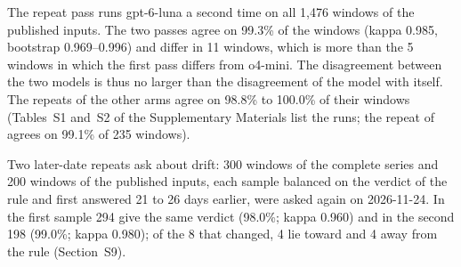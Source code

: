The repeat pass runs gpt-6-luna a second time on all 1{,}476 windows of the published inputs. The two passes agree on 99.3\% of the windows (kappa 0.985, bootstrap 0.969--0.996) and differ in 11 windows, which is more than the 5 windows in which the first pass differs from o4-mini. The disagreement between the two models is thus no larger than the disagreement of the model with itself. The repeats of the other arms agree on 98.8\% to 100.0\% of their windows (Tables~S1 and~S2 of the Supplementary Materials list the runs; the repeat of  agrees on 99.1\% of 235 windows).

Two later-date repeats ask about drift: 300 windows of the complete series and 200 windows of the published inputs, each sample balanced on the verdict of the rule and first answered 21 to 26 days earlier, were asked again on 2026-11-24. In the first sample 294 give the same verdict (98.0\%; kappa 0.960) and in the second 198 (99.0\%; kappa 0.980); of the 8 that changed, 4 lie toward and 4 away from the rule (Section~S9).

